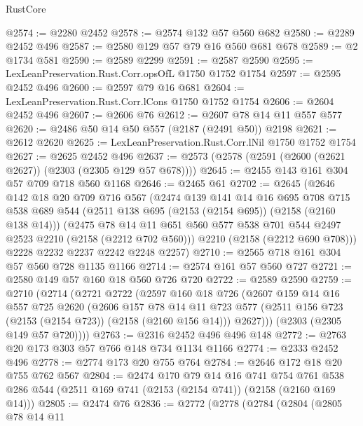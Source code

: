 \begin{lexlean}{RustCore}
\begin{coremodule}
@2574 := @2280 @2452
@2578 := @2574 @132 @57 @560 @682
@2580 := @2289 @2452 @496
@2587 := @2580 @129 @57 @79 @16 @560 @681 @678
@2589 := @2 @1734 @581
@2590 := @2589 @2299
@2591 := @2587 @2590
@2595 := LexLeanPreservation.Rust.Corr.opsOfL @1750 @1752 @1754
@2597 := @2595 @2452 @496
@2600 := @2597 @79 @16 @681
@2604 := LexLeanPreservation.Rust.Corr.lCons @1750 @1752 @1754
@2606 := @2604 @2452 @496
@2607 := @2606 @76
@2612 := @2607 @78 @14 @11 @557 @577
@2620 := @2486 @50 @14 @50 @557 (@2187 (@2491 @50)) @2198
@2621 := @2612 @2620
@2625 := LexLeanPreservation.Rust.Corr.lNil @1750 @1752 @1754
@2627 := @2625 @2452 @496
@2637 := @2573 (@2578 (@2591 (@2600 (@2621 @2627)) (@2303 (@2305 @129 @57 @678))))
@2645 := @2455 @143 @161 @304 @57 @709 @718 @560 @1168
@2646 := @2465 @61
@2702 := @2645
    (@2646
      @142
      @18
      @20
      @709
      @716
      @567
      (@2474
        @139
        @141
        @14
        @16
        @695
        @708
        @715
        @538
        @689
        @544
        (@2511 @138 @695 (@2153 (@2154 @695)) (@2158 (@2160 @138 @14)))
        (@2475
          @78
          @14
          @11
          @651
          @560
          @577
          @538
          @701
          @544
          @2497
          @2523
          @2210
          (@2158 (@2212 @702 @560)))
        @2210
        (@2158 (@2212 @690 @708)))
      @2228
      @2232
      @2237
      @2242
      @2248
      @2257)
@2710 := @2565 @718 @161 @304 @57 @560 @728 @1135 @1166
@2714 := @2574 @161 @57 @560 @727
@2721 := @2580 @149 @57 @160 @18 @560 @726 @720
@2722 := @2589 @2590
@2759 := @2710
    (@2714
      (@2721
        @2722
        (@2597
          @160
          @18
          @726
          (@2607
            @159
            @14
            @16
            @557
            @725
            @2620
            (@2606
              @157
              @78
              @14
              @11
              @723
              @577
              (@2511 @156 @723 (@2153 (@2154 @723)) (@2158 (@2160 @156 @14)))
              @2627)))
        (@2303 (@2305 @149 @57 @720))))
@2763 := @2316 @2452 @496 @496 @148
@2772 := @2763 @20 @173 @303 @57 @766 @148 @734 @1134 @1166
@2774 := @2333 @2452 @496
@2778 := @2774 @173 @20 @755 @764
@2784 := @2646 @172 @18 @20 @755 @762 @567
@2804 := @2474
    @170
    @79
    @14
    @16
    @741
    @754
    @761
    @538
    @286
    @544
    (@2511 @169 @741 (@2153 (@2154 @741)) (@2158 (@2160 @169 @14)))
@2805 := @2474 @76
@2836 := @2772
    (@2778
      (@2784
        (@2804
          (@2805
            @78
            @14
            @11

\end{coremodule}
\end{lexlean}

